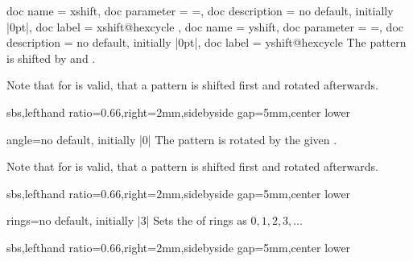 \documentclass[a4paper,11pt]{article}
\begin{document}
\begin{myvoid}
\begin{docPatternKeys}
  {
    {
      doc name        = xshift,
      doc parameter   = {=},
      doc description = {no default, initially |0pt|},
      doc label       = xshift@hexcycle
    },
    {
      doc name        = yshift,
      doc parameter   = {=},
      doc description = {no default, initially |0pt|},
      doc label       = yshift@hexcycle
    }
  }
  The pattern is shifted by  and .
  \par
  Note that for  is valid, that a pattern is shifted first and rotated afterwards.
\begin{dispExample*}{sbs,lefthand ratio=0.66,right=2mm,sidebyside gap=5mm,center lower}
\end{dispExample*}
\end{docPatternKeys}


\begin{docPatternKey}[][doc label=angle@hexcycle]{angle}{=}{no default, initially |0|}
  The pattern is rotated by the given .
  \par
  Note that for  is valid, that a pattern is shifted first and rotated afterwards.
\begin{dispExample*}{sbs,lefthand ratio=0.66,right=2mm,sidebyside gap=5mm,center lower}
\end{dispExample*}
\end{docPatternKey}


\clearpage


\begin{docPatternKey}[][doc label=rings@hexcycle]{rings}{=}{no default, initially |3|}
  Sets the  of rings as $0, 1, 2, 3, \ldots$

\begin{dispExample*}{sbs,lefthand ratio=0.66,right=2mm,sidebyside gap=5mm,center lower}
\end{dispExample*}
\end{docPatternKey}



\end{myvoid}
\end{document}
